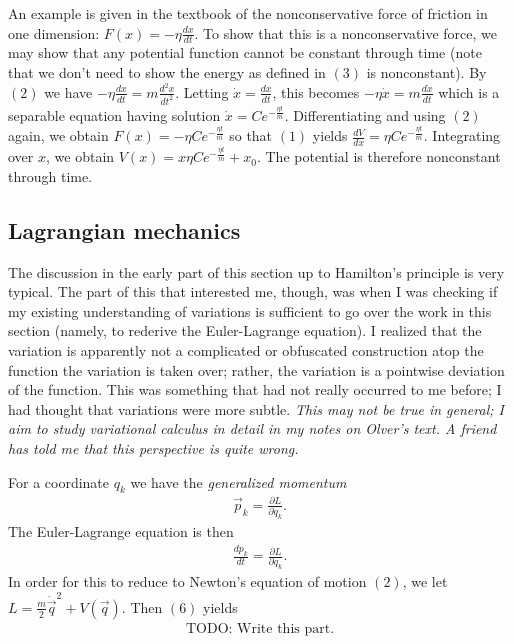 \documentclass[a4paper]{article}
\begin{document}
An example is given in the textbook of the nonconservative force of friction in one dimension: $F(x) = -\eta \frac{dx}{dt}$. To show that this is a nonconservative force, we may show that any potential function cannot be constant through time (note that we don't need to show the energy as defined in $(3)$ is nonconstant). By $(2)$ we have $-\eta \frac{dx}{dt} = m\frac{d^2x}{dt^2}$. Letting $\dot{x} = \frac{dx}{dt}$, this becomes $-\eta \dot{x} = m\frac{d\dot{x}}{dt}$ which is a separable equation having solution $\dot{x} = Ce^{-\frac{\eta t}{m}}$. Differentiating and using $(2)$ again, we obtain $F(x) = -\eta Ce^{-\frac{\eta t}{m}}$ so that $(1)$ yields $\frac{dV}{dx} = \eta Ce^{-\frac{\eta t}{m}}$. Integrating over $x$, we obtain $V(x) = x\eta Ce^{-\frac{\eta t}{m}} + x_0$. The potential is therefore nonconstant through time.

\subsection{Lagrangian mechanics}

The discussion in the early part of this section up to Hamilton's principle is very typical. The part of this that interested me, though, was when I was checking if my existing understanding of variations is sufficient to go over the work in this section (namely, to rederive the Euler-Lagrange equation). I realized that the variation is apparently not a complicated or obfuscated construction atop the function the variation is taken over; rather, the variation is a pointwise deviation of the function. This was something that had not really occurred to me before; I had thought that variations were more subtle. \emph{This may not be true in general; I aim to study variational calculus in detail in my notes on Olver's text. A friend has told me that this perspective is quite wrong.}

For a coordinate $q_k$ we have the \emph{generalized momentum}
\begin{align}
    \vec{p}_k = \frac{\partial L}{\partial \dot{q}_k}.
\end{align}
The Euler-Lagrange equation is then
\begin{align}
    \frac{dp_k}{dt} = \frac{\partial L}{\partial q_k}.
\end{align}
In order for this to reduce to Newton's equation of motion $(2)$, we let $L = \frac{m}{2}\dot{\vec{q}}^2 + V(\vec{q})$. Then $(6)$ yields
\begin{align}
    \text{TODO: Write this part.}
\end{align}
\end{document}
